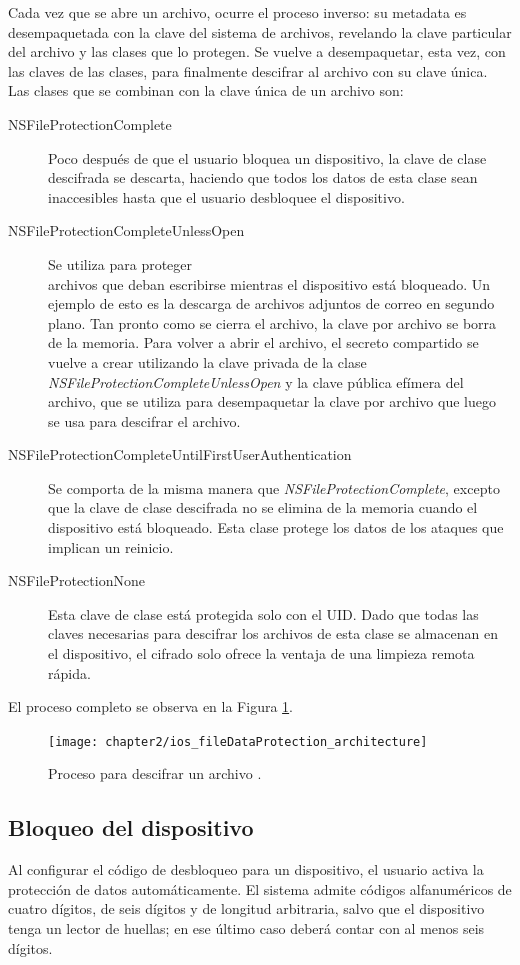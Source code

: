 Cada vez que se abre un archivo, ocurre el proceso inverso: su metadata es desempaquetada con la clave del sistema de archivos, revelando la clave particular del archivo y las clases que lo protegen. Se vuelve a desempaquetar, esta vez, con las claves de las clases, para finalmente descifrar al archivo con su clave única.\\

Las clases que se combinan con la clave única de un archivo son:
\begin{description}
\item[NSFileProtectionComplete] Poco después de que el usuario bloquea un dispositivo, la clave de clase descifrada se descarta, haciendo que todos los datos de esta clase sean inaccesibles hasta que el usuario desbloquee el dispositivo.
\item[NSFileProtectionCompleteUnlessOpen] Se utiliza para proteger \\archivos que deban escribirse mientras el dispositivo está bloqueado. Un ejemplo de esto es la descarga de archivos adjuntos de correo en segundo plano. Tan pronto como se cierra el archivo, la clave por archivo se borra de la memoria. Para volver a abrir el archivo, el secreto compartido se vuelve a crear utilizando la clave privada de la clase \emph{NSFileProtectionCompleteUnlessOpen} y la clave pública efímera del archivo, que se utiliza para desempaquetar la clave por archivo que luego se usa para descifrar el archivo.
\item[NSFileProtectionCompleteUntilFirstUserAuthentication] Se comporta de la misma manera que \emph{NSFileProtectionComplete}, excepto que la clave de clase descifrada no se elimina de la memoria cuando el dispositivo está bloqueado. Esta clase protege los datos de los ataques que implican un reinicio.
\item[NSFileProtectionNone] Esta clave de clase está protegida solo con el UID. Dado que todas las claves necesarias para descifrar los archivos de esta clase se almacenan en el dispositivo, el cifrado solo ofrece la ventaja de una limpieza remota rápida.
\end{description}
El proceso completo se observa en la Figura \ref{fig:ch02:dataProtection}.
\begin{figure}[hbtp]
    \centering
    \texttt{[image: chapter2/ios\_fileDataProtection\_architecture]}
    \caption{Proceso para descifrar un archivo \cite{asg}.}
    \label{fig:ch02:dataProtection}
\end{figure}
\subsection{Bloqueo del dispositivo}
Al configurar el código de desbloqueo para un dispositivo, el usuario activa la protección de datos automáticamente. El sistema admite códigos alfanuméricos de cuatro dígitos, de seis dígitos y de longitud arbitraria, salvo que el dispositivo tenga un lector de huellas; en ese último caso deberá contar con al menos seis dígitos.\\

